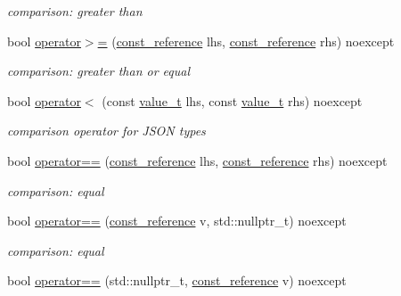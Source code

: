 \begin{DoxyCompactItemize}
\begin{DoxyCompactList}\small\item\em comparison\-: greater than \end{DoxyCompactList}\item 
bool \hyperlink{classnlohmann_1_1basic__json_a74a943800c7f103d0990d7eef82c6453}{operator$>$=} (\hyperlink{classnlohmann_1_1basic__json_af677a29b0e66edc9f66e5167e4667071}{const\-\_\-reference} lhs, \hyperlink{classnlohmann_1_1basic__json_af677a29b0e66edc9f66e5167e4667071}{const\-\_\-reference} rhs) noexcept
\begin{DoxyCompactList}\small\item\em comparison\-: greater than or equal \end{DoxyCompactList}\item 
bool \hyperlink{classnlohmann_1_1basic__json_a24d7df0b5b41319dbab2713d3641faf7}{operator$<$} (const \hyperlink{classnlohmann_1_1basic__json_a231b02148577b69a154b2ce2c87a5522}{value\-\_\-t} lhs, const \hyperlink{classnlohmann_1_1basic__json_a231b02148577b69a154b2ce2c87a5522}{value\-\_\-t} rhs) noexcept
\begin{DoxyCompactList}\small\item\em comparison operator for J\-S\-O\-N types \end{DoxyCompactList}\item 
bool \hyperlink{classnlohmann_1_1basic__json_a122640e7e2db1814fc7bbb3c122ec76e}{operator==} (\hyperlink{classnlohmann_1_1basic__json_af677a29b0e66edc9f66e5167e4667071}{const\-\_\-reference} lhs, \hyperlink{classnlohmann_1_1basic__json_af677a29b0e66edc9f66e5167e4667071}{const\-\_\-reference} rhs) noexcept
\begin{DoxyCompactList}\small\item\em comparison\-: equal \end{DoxyCompactList}\item 
bool \hyperlink{classnlohmann_1_1basic__json_a9730b9f7bc2150e641fe20198d4477c7}{operator==} (\hyperlink{classnlohmann_1_1basic__json_af677a29b0e66edc9f66e5167e4667071}{const\-\_\-reference} v, std\-::nullptr\-\_\-t) noexcept
\begin{DoxyCompactList}\small\item\em comparison\-: equal \end{DoxyCompactList}\item 
bool \hyperlink{classnlohmann_1_1basic__json_a98e05a2c9b8f74bd60442772cddeee52}{operator==} (std\-::nullptr\-\_\-t, \hyperlink{classnlohmann_1_1basic__json_af677a29b0e66edc9f66e5167e4667071}{const\-\_\-reference} v) noexcept

\end{DoxyCompactItemize}
